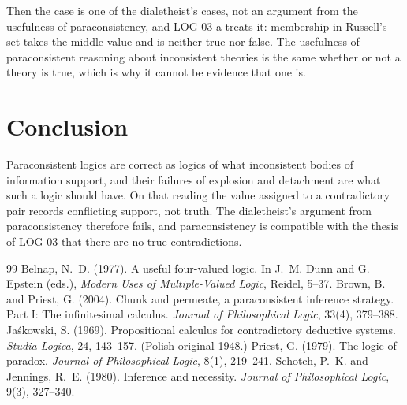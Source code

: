 \documentclass{situationist-preprint}
\begin{document}
\begin{reply}
Then the case is one of the dialetheist's cases, not an argument from the usefulness of paraconsistency, and LOG-03-a treats it: membership in Russell's set takes the middle value and is neither true nor false. The usefulness of paraconsistent reasoning about inconsistent theories is the same whether or not a theory is true, which is why it cannot be evidence that one is.
\end{reply}

\section{Conclusion}

Paraconsistent logics are correct as logics of what inconsistent bodies of information support, and their failures of explosion and detachment are what such a logic should have. On that reading the value assigned to a contradictory pair records conflicting support, not truth. The dialetheist's argument from paraconsistency therefore fails, and paraconsistency is compatible with the thesis of LOG-03 that there are no true contradictions.

\begin{thebibliography}{99}\small
{} Belnap, N.~D. (1977). A useful four-valued logic. In J.~M. Dunn and G. Epstein (eds.), \emph{Modern Uses of Multiple-Valued Logic}, Reidel, 5--37.
 Brown, B. and Priest, G. (2004). Chunk and permeate, a paraconsistent inference strategy. Part I: The infinitesimal calculus. \emph{Journal of Philosophical Logic}, 33(4), 379--388.
 Ja\'skowski, S. (1969). Propositional calculus for contradictory deductive systems. \emph{Studia Logica}, 24, 143--157. (Polish original 1948.)
 Priest, G. (1979). The logic of paradox. \emph{Journal of Philosophical Logic}, 8(1), 219--241.
 Schotch, P.~K. and Jennings, R.~E. (1980). Inference and necessity. \emph{Journal of Philosophical Logic}, 9(3), 327--340.
\end{thebibliography}
\end{document}
